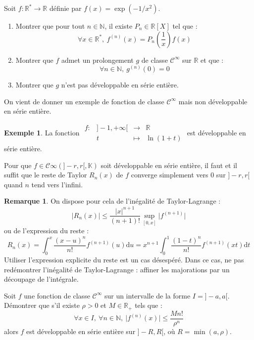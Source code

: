 \documentclass[french]{article}
\newcommand{\N}{\mathbb{N}}
\newcommand{\R}{\mathbb{R}}
\newcommand{\K}{\mathbb{K}}
\newcommand{\st}{^*}
\renewcommand{\d}{\text{d}}
\theoremstyle{plain}
\theoremstyle{definition}
\newtheorem*{ex}{Exemple}
\newtheorem*{rmq}{Remarque}
\theoremstyle{remark}
\begin{document}
\begin{exo}
	Soit $f:\R\st\to\R$ définie par $f(x)=\exp(-1/x^2)$.
	\begin{enumerate}
		\item Montrer que pour tout $n\in\N$, il existe $P_n\in\R[X]$ tel que : $$\forall x\in\R\st,\ f^{(n)}(x)=P_n\left(\frac{1}{x}\right)f(x)$$
		\item Montrer que $f$ admet un prolongement $g$ de classe $\mathcal{C}^\infty$ sur $\R$ et que : $$\forall n\in\N,\ g^{(n)}(0)=0$$
		\item Montrer que $g$ n'est pas développable en série entière.
	\end{enumerate}
	On vient de donner un exemple de fonction de classe $\mathcal{C}^\infty$ mais non développable en série entière.
\end{exo}

\begin{ex}
	La fonction $\begin{array}{lrcl}
		f:&]-1,+\infty[&\longrightarrow&\R\\
		&t&\longmapsto&\ln(1+t)
	\end{array}$ est développable en série entière.
\end{ex}

\begin{prop}%
	Pour que $f\in\mathcal{C}\infty(]-r,r[,\K)$ soit développable en série entière, il faut et il suffit que le reste de Taylor $R_n(x)$ de $f$ converge simplement vers $0$ sur $]-r,r[$ quand $n$ tend vers l'infini.
\end{prop}

\begin{rmq}
	On dispose pour cela de l'inégalité de Taylor-Lagrange : $$\lvert R_n(x)\rvert\leqslant\frac{\lvert x\rvert^{n+1}}{(n+1)!}\underset{[0,x]}{\sup}\lvert f^{(n+1)}\rvert$$ ou de l'expression du reste : $$R_n(x)=\int_{0}^{x}\frac{(x-u)^n}{n!}f^{(n+1)}(u)\d u=x^{n+1}\int_{0}^{1}\frac{(1-t)^n}{n!}f^{(n+1)}(xt)\d t$$ Utiliser l'expression explicite du reste est un cas désespéré. Dans ce cas, ne pas redémontrer l'inégalité de Taylor-Lagrange : affiner les majorations par un découpage de l'intégrale.
\end{rmq}

\begin{exo}
	Soit $f$ une fonction de classe $\mathcal{C}^\infty$ sur un intervalle de la forme $I=]-a,a[$. Démontrer que s'il existe $\rho >0$ et $M\in\R_+$ tels que : $$\forall x\in I,\ \forall n\in\N,\ \lvert f^{(n)}(x)\rvert\leqslant\frac{Mn!}{\rho^n}$$ alors $f$ est développable en série entière sur $]-R,R[$, où $R=\min(a,\rho)$.
\end{exo}
\end{document}
